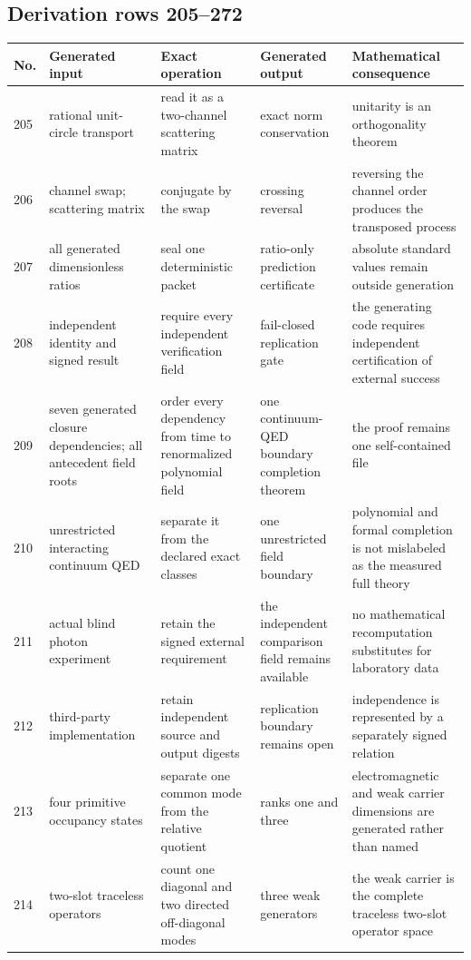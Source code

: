 \documentclass[11pt]{article}
\numberwithin{equation}{section}
\theoremstyle{remark}
\begin{document}
\begin{landscape}
\subsection{Derivation rows 205--272}
\begin{longtable}{p{0.65cm}p{3.5cm}p{4.0cm}p{4.0cm}p{4.6cm}}
\toprule No.&Generated input&Exact operation&Generated output&Mathematical consequence\\\midrule\endhead
205&rational unit-circle transport&read it as a two-channel scattering matrix&exact norm conservation&unitarity is an orthogonality theorem\\
206&channel swap; scattering matrix&conjugate by the swap&crossing reversal&reversing the channel order produces the transposed process\\
207&all generated dimensionless ratios&seal one deterministic packet&ratio-only prediction certificate&absolute standard values remain outside generation\\
208&independent identity and signed result&require every independent verification field&fail-closed replication gate&the generating code requires independent certification of external success\\
209&seven generated closure dependencies; all antecedent field roots&order every dependency from time to renormalized polynomial field&one continuum-QED boundary completion theorem&the proof remains one self-contained file\\
210&unrestricted interacting continuum QED&separate it from the declared exact classes&one unrestricted field boundary&polynomial and formal completion is not mislabeled as the measured full theory\\
211&actual blind photon experiment&retain the signed external requirement&the independent comparison field remains available&no mathematical recomputation substitutes for laboratory data\\
212&third-party implementation&retain independent source and output digests&replication boundary remains open&independence is represented by a separately signed relation\\
213&four primitive occupancy states&separate one common mode from the relative quotient&ranks one and three&electromagnetic and weak carrier dimensions are generated rather than named\\
214&two-slot traceless operators&count one diagonal and two directed off-diagonal modes&three weak generators&the weak carrier is the complete traceless two-slot operator space\\

\end{longtable}
\end{landscape}
\end{document}
